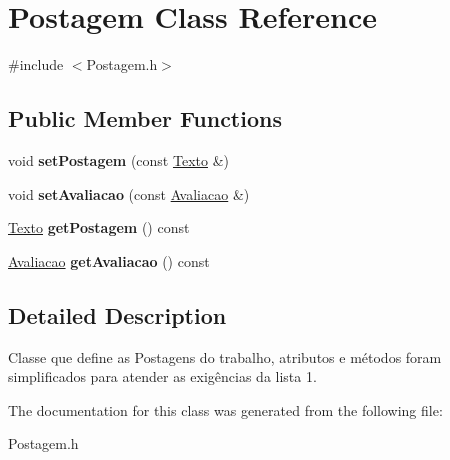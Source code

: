 \hypertarget{classPostagem}{}\section{Postagem Class Reference}
\label{classPostagem}


{\ttfamily \#include $<$Postagem.\+h$>$}

\subsection*{Public Member Functions}
\begin{DoxyCompactItemize}
\item 
void {\bfseries set\+Postagem} (const \hyperlink{classTexto}{Texto} \&)\hypertarget{classPostagem_afd8238f326258fd9d5a56d9bbb7722e9}{}\label{classPostagem_afd8238f326258fd9d5a56d9bbb7722e9}

\item 
void {\bfseries set\+Avaliacao} (const \hyperlink{classAvaliacao}{Avaliacao} \&)\hypertarget{classPostagem_ab63f045e1b582481f063e3075e48639e}{}\label{classPostagem_ab63f045e1b582481f063e3075e48639e}

\item 
\hyperlink{classTexto}{Texto} {\bfseries get\+Postagem} () const \hypertarget{classPostagem_a2888175035a82772ab0df42d909772ae}{}\label{classPostagem_a2888175035a82772ab0df42d909772ae}

\item 
\hyperlink{classAvaliacao}{Avaliacao} {\bfseries get\+Avaliacao} () const \hypertarget{classPostagem_a889dcffdbf4fb1983a1bbb7fa3b44af1}{}\label{classPostagem_a889dcffdbf4fb1983a1bbb7fa3b44af1}

\end{DoxyCompactItemize}


\subsection{Detailed Description}
Classe que define as Postagens do trabalho, atributos e métodos foram simplificados para atender as exigências da lista 1. 

The documentation for this class was generated from the following file\+:\begin{DoxyCompactItemize}
\item 
Postagem.\+h\end{DoxyCompactItemize}
